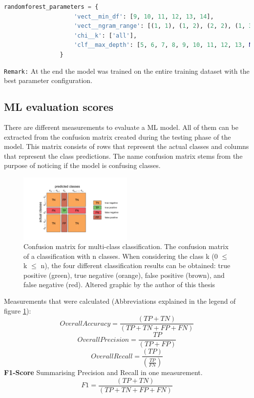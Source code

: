 \begin{lstlisting}[language=Python, caption=Tuned hyperparameters of the randomForest fitting algorithm]
randomforest_parameters = {
                    'vect__min_df': [9, 10, 11, 12, 13, 14],
                    'vect__ngram_range': [(1, 1), (1, 2), (2, 2), (1, 3)],
                    'chi__k': ['all'],
                    'clf__max_depth': [5, 6, 7, 8, 9, 10, 11, 12, 13, None]
                }
\end{lstlisting}

\texttt{Remark:} At the end the model was trained on the entire training dataset with the best parameter configuration.\\

\subsection{ML evaluation scores} \label{ml_evaluation_scores}
There are different measurements to evaluate a ML model. All of them can be extracted from the confusion matrix created during the testing phase of the model. This matrix consists of rows that represent the actual classes and columns that represent the class predictions. The name confusion matrix stems from the purpose of noticing if the model is confusing classes.
\begin{figure}[h]
       \centering
       \includegraphics[width=0.5\textwidth]{img/Confusion_matrix_edited}
       \caption{Confusion matrix for multi-class classification. The confusion matrix of a classification with n classes. When considering the class k (0 $\le$ k $\le$ n), the four different classification results can be obtained: true positive (green), true negative (orange), false positive (brown), and false negative (red). Altered graphic by the author of this thesis \parencite{Kruger2018}}
       \label{fig:confusion_matrix_illustration}
\end{figure}
    
Measurements that were calculated (Abbreviations explained in the legend of figure \ref{fig:confusion_matrix_illustration}):
\[Overall Accuracy = \frac{(TP+TN)}{(TP+TN+FP+FN)}\]
\[Overall Precision = \frac{TP}{(TP+FP)}\]
\[Overall Recall = \frac{(TP)}{(\frac{TP}{FN})}\]
\textbf{F1-Score} Summarising Precision and Recall in one measurement.\\ 
\[F1 = \frac{(TP+TN)}{(TP+TN+FP+FN)}\]

